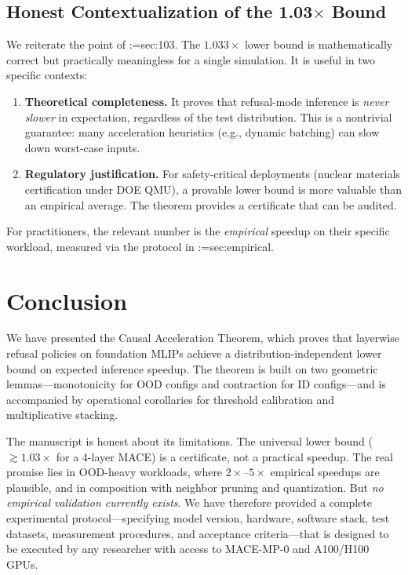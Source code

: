 \documentclass[11pt,a4paper]{article}
\makeatletter
\newcommand{\cref}[1]{\begingroup\def\crefsep{}\@for\crefitem:=#1\do{\crefsep\ref{\crefitem}\def\crefsep{, }}\endgroup}
\makeatother
\begin{document}
\subsection{Honest Contextualization of the 1.03$\times$ Bound}

We reiterate the point of \cref{sec:103}. The $1.033\times$ lower bound is mathematically correct but practically meaningless for a single simulation. It is useful in two specific contexts:
\begin{enumerate}
    \item \textbf{Theoretical completeness.} It proves that refusal-mode inference is \emph{never slower} in expectation, regardless of the test distribution. This is a nontrivial guarantee: many acceleration heuristics (e.g., dynamic batching) can slow down worst-case inputs.
    \item \textbf{Regulatory justification.} For safety-critical deployments (nuclear materials certification under DOE QMU\cite{asc2008}), a provable lower bound is more valuable than an empirical average. The theorem provides a certificate that can be audited.
\end{enumerate}
For practitioners, the relevant number is the \emph{empirical} speedup on their specific workload, measured via the protocol in \cref{sec:empirical}.

\section{Conclusion}\label{sec:conclusion}

We have presented the Causal Acceleration Theorem, which proves that layerwise refusal policies on foundation MLIPs achieve a distribution-independent lower bound on expected inference speedup. The theorem is built on two geometric lemmas---monotonicity for OOD configs and contraction for ID configs---and is accompanied by operational corollaries for threshold calibration and multiplicative stacking.

The manuscript is honest about its limitations. The universal lower bound ($\gtrsim 1.03\times$ for a 4-layer MACE) is a certificate, not a practical speedup. The real promise lies in OOD-heavy workloads, where $2\times$--$5\times$ empirical speedups are plausible, and in composition with neighbor pruning and quantization. But \emph{no empirical validation currently exists}. We have therefore provided a complete experimental protocol---specifying model version, hardware, software stack, test datasets, measurement procedures, and acceptance criteria---that is designed to be executed by any researcher with access to MACE-MP-0 and A100/H100 GPUs.
\end{document}
